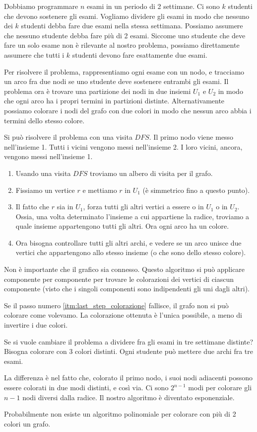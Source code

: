 \begin{exmp}
Dobbiamo programmare $n$ esami in un periodo di 2 settimane. Ci sono $k$ studenti che devono sostenere gli esami. Vogliamo dividere gli esami in modo che nessuno dei $k$ studenti debba fare due esami nella stessa settimana. Possiamo assumere che nessuno studente debba fare pi\`u di 2 esami. Siccome uno studente che deve fare un solo esame non \`e rilevante al nostro problema, possiamo direttamente assumere che tutti i $k$ studenti devono fare esattamente due esami.

Per risolvere il problema, rappresentiamo ogni esame con un nodo, e tracciamo un arco fra due nodi se uno studente deve sostenere entrambi gli esami. Il problema ora \`e trovare una partizione dei nodi in due insiemi $U_1$ e $U_2$ in modo che ogni arco ha i propri termini in partizioni distinte. Alternativamente possiamo colorare i nodi del grafo con due colori in modo che nessun arco abbia i termini dello stesso colore.

Si pu\`o risolvere il problema con una visita $DFS$. Il primo nodo viene messo nell'insieme 1. Tutti i vicini vengono messi nell'insieme 2. I loro vicini, ancora, vengono messi nell'insieme 1.
\begin{enumerate}
    \item Usando una visita $DFS$ troviamo un albero di visita per il grafo.
    \item Fissiamo un vertice $r$ e mettiamo $r$ in $U_1$ (\`e simmetrico fino a questo punto).
    \item Il fatto che $r$ sia in $U_1$, forza tutti gli altri vertici a essere o in $U_1$ o in $U_2$. Ossia, una volta determinato l'insieme a cui appartiene la radice, troviamo a quale insieme appartengono tutti gli altri. Ora ogni arco ha un colore.
    \item\label{itm:last_step_colorazione} Ora bisogna controllare tutti gli altri archi, e vedere se un arco unisce due vertici che appartengono allo stesso insieme (o che sono dello stesso colore).
\end{enumerate}
Non \`e importante che il grafico sia connesso. Questo algoritmo si pu\`o applicare componente per componente per trovare le colorazioni dei vertici di ciascun componente (visto che i singoli componenti sono indipendenti gli uni dagli altri).

Se il passo numero \ref{itm:last_step_colorazione} fallisce, il grafo non si pu\`o colorare come volevamo. La colorazione ottenuta \`e l'unica possibile, a meno di invertire i due colori.

Se si vuole cambiare il problema a dividere fra gli esami in tre settimane distinte? Bisogna colorare con 3 colori distinti. Ogni studente pu\`o mettere due archi fra tre esami.

La differenza \`e nel fatto che, colorato il primo nodo, i suoi nodi adiacenti possono essere colorati in due modi distinti, e cos\`i via. Ci sono $2^{n-1}$ modi per colorare gli $n-1$ nodi diversi dalla radice. Il nostro algoritmo \`e diventato esponenziale.

Probabilmente non esiste un algoritmo polinomiale per colorare con pi\`u di 2 colori un grafo.
\end{exmp}

